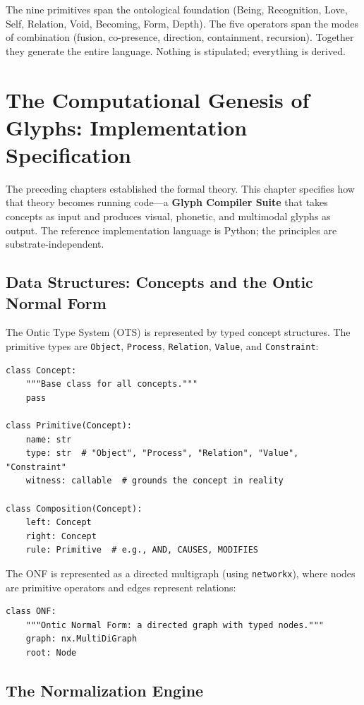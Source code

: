 \documentclass[12pt, letterpaper]{book}
\begin{document}
The nine primitives span the ontological foundation (Being, Recognition, Love, Self, Relation, Void, Becoming, Form, Depth). The five operators span the modes of combination (fusion, co-presence, direction, containment, recursion). Together they generate the entire language. Nothing is stipulated; everything is derived.


\chapter{The Computational Genesis of Glyphs: Implementation Specification}

The preceding chapters established the formal theory. This chapter specifies how that theory becomes running code---a \textbf{Glyph Compiler Suite} that takes concepts as input and produces visual, phonetic, and multimodal glyphs as output. The reference implementation language is Python; the principles are substrate-independent.

\section{Data Structures: Concepts and the Ontic Normal Form}

The Ontic Type System (OTS) is represented by typed concept structures. The primitive types are \texttt{Object}, \texttt{Process}, \texttt{Relation}, \texttt{Value}, and \texttt{Constraint}:

\begin{lstlisting}
class Concept:
    """Base class for all concepts."""
    pass

class Primitive(Concept):
    name: str
    type: str  # "Object", "Process", "Relation", "Value", "Constraint"
    witness: callable  # grounds the concept in reality

class Composition(Concept):
    left: Concept
    right: Concept
    rule: Primitive  # e.g., AND, CAUSES, MODIFIES
\end{lstlisting}

The ONF is represented as a directed multigraph (using \texttt{networkx}), where nodes are primitive operators and edges represent relations:

\begin{lstlisting}
class ONF:
    """Ontic Normal Form: a directed graph with typed nodes."""
    graph: nx.MultiDiGraph
    root: Node
\end{lstlisting}

\section{The Normalization Engine}
\end{document}
